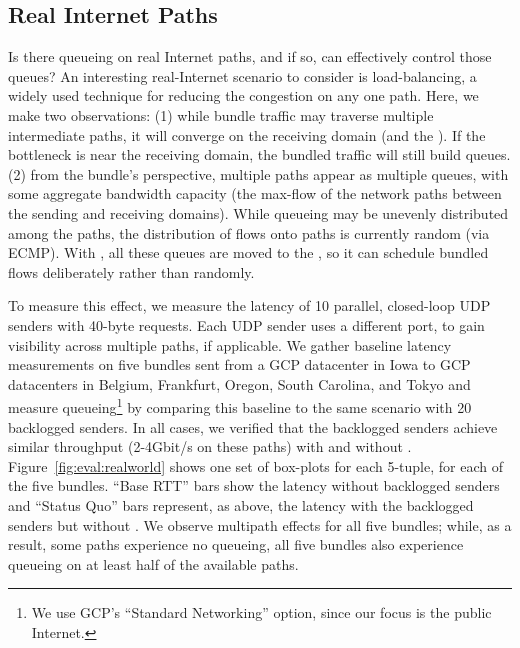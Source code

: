 %

\subsection{Real Internet Paths}\label{s:eval:realworld}



Is there queueing on real Internet paths, and if so, can \name effectively control those queues?
An interesting real-Internet scenario to consider is load-balancing, a widely used technique for reducing the congestion on any one path.
Here, we make two observations: 
(1) while bundle traffic may traverse multiple intermediate paths, it will converge on the receiving domain (and the \outbox). If the bottleneck is near the receiving domain, the bundled traffic will still build queues.
(2) from the bundle's perspective, multiple paths appear as multiple queues, with some aggregate bandwidth capacity (\ie the max-flow of the network paths between the sending and receiving domains). While queueing may be unevenly distributed among the paths, the distribution of flows onto paths is currently random (\eg via ECMP). With \name, all these queues are moved to the \inbox, so it can schedule bundled flows deliberately rather than randomly.

To measure this effect, we measure the latency of 10 parallel, closed-loop UDP senders with 40-byte requests. Each UDP sender uses a different port, to gain visibility across multiple paths, if applicable.
We gather baseline latency measurements on five bundles sent from a GCP datacenter in Iowa to GCP datacenters in Belgium, Frankfurt, Oregon, South Carolina, and Tokyo and measure queueing\footnote{We use GCP's ``Standard Networking'' option, since our focus is the public Internet.}
by comparing this baseline to the same scenario with 20 backlogged senders.
In all cases, we verified that the backlogged senders achieve similar throughput (2-4Gbit/s on these paths) with and without \name.
Figure~\ref{fig:eval:realworld} shows one set of box-plots for each 5-tuple, for each of the five bundles. ``Base RTT'' bars show the latency without backlogged senders and ``Status Quo'' bars represent, as above, the latency with the backlogged senders but without \name.
We observe multipath effects for all five bundles; while, as a result, some paths experience no queueing, all five bundles also experience queueing on at least half of the available paths.

